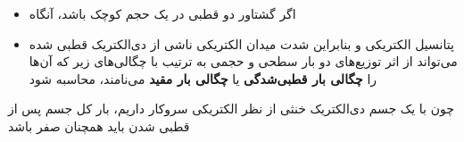 \begin{ELunit}

\begin{itemize}
\tightlist
\item
  اگر  گشتاور دو قطبی در یک حجم کوچک  باشد، آنگاه
\end{itemize}


\begin{itemize}
\tightlist
\item
  پتانسیل الکتریکی و بنابراین شدت میدان الکتریکی ناشی از دی‌الکتریک قطبی شده می‌تواند از اثر توزیع‌های دو بار سطحی و حجمی به ترتیب با چگالی‌های زیر که آن‌ها را \textbf{چگالی بار قطبی‌شدگی} یا \textbf{چگالی بار مقید} می‌نامند، محاسبه شود
\end{itemize}

\end{ELunit}

\begin{ELimportant}{}


\end{ELimportant}

\begin{ELremark}{}

چون با یک جسم دی‌الکتریک خنثی از نظر الکتریکی سروکار داریم، بار کل جسم پس از قطبی شدن باید همچنان صفر باشد

\end{ELremark}

\ELhold


